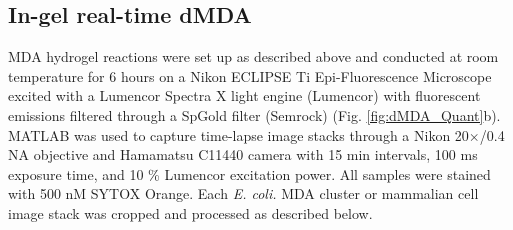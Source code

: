 \subsection{In-gel real-time dMDA}
MDA hydrogel reactions were set up as described above and conducted at room temperature for 6 hours on a Nikon ECLIPSE Ti Epi-Fluorescence Microscope excited with a Lumencor Spectra X light engine (Lumencor) with fluorescent emissions filtered through a SpGold filter (Semrock) (Fig. \ref{fig:dMDA_Quant}b). MATLAB was used to capture time-lapse image stacks through a Nikon 20$\times$\slash 0.4 NA objective and Hamamatsu C11440 camera with 15 min intervals, 100 ms exposure time, and 10 \% Lumencor excitation power. All samples were stained with 500 nM SYTOX Orange. Each \textit{E. coli.} MDA cluster or mammalian cell image stack was cropped and processed as described below.






